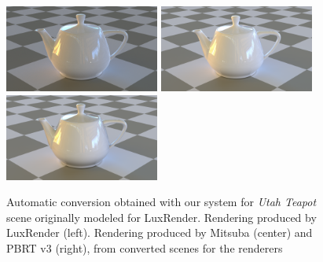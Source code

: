\begin{figure}
\centering
\includegraphics[width=2in]{figs/4_results/teapot/1_from_lux.png}
\includegraphics[width=2in]{figs/4_results/teapot/2_to_mitsuba.png}
\includegraphics[width=2in]{figs/4_results/teapot/3_to_pbrt.png}
\caption{Automatic conversion obtained with our system for \textit{Utah Teapot}
scene originally modeled for LuxRender. Rendering produced by LuxRender (left).
Rendering produced by Mitsuba (center) and PBRT v3 (right),
from converted scenes for the renderers}
\label{fig:staircase}
\end{figure}

